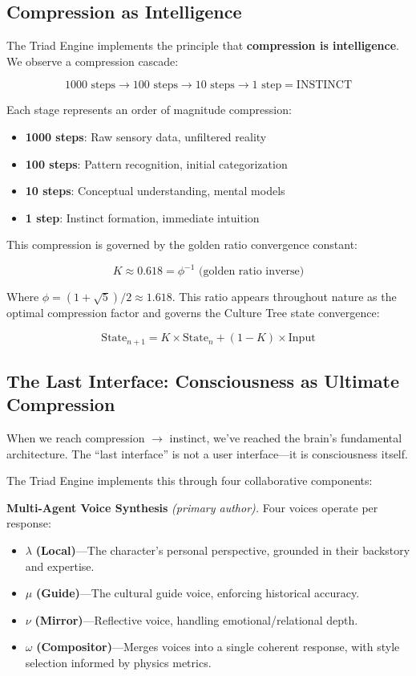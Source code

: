 \documentclass[11pt,a4paper]{article}
\begin{document}
\subsection{Compression as Intelligence}

The Triad Engine implements the principle that \textbf{compression is intelligence}. We observe a compression cascade:

\[
1000 \text{ steps} \rightarrow 100 \text{ steps} \rightarrow 10 \text{ steps} \rightarrow 1 \text{ step} = \text{INSTINCT}
\]

Each stage represents an order of magnitude compression:
\begin{itemize}
  \item \textbf{1000 steps}: Raw sensory data, unfiltered reality
  \item \textbf{100 steps}: Pattern recognition, initial categorization  
  \item \textbf{10 steps}: Conceptual understanding, mental models
  \item \textbf{1 step}: Instinct formation, immediate intuition
\end{itemize}

This compression is governed by the golden ratio convergence constant:

\[
K \approx 0.618 = \phi^{-1} \text{ (golden ratio inverse)}
\]

Where $\phi = (1+\sqrt{5})/2 \approx 1.618$. This ratio appears throughout nature as the optimal compression factor and governs the Culture Tree state convergence:

\[
\text{State}_{n+1} = K \times \text{State}_n + (1-K) \times \text{Input}
\]

\subsection{The Last Interface: Consciousness as Ultimate Compression}

When we reach compression $\rightarrow$ instinct, we've reached the brain's fundamental architecture. The ``last interface'' is not a user interface---it is consciousness itself.

The Triad Engine implements this through four collaborative components:

\medskip
\textbf{Multi-Agent Voice Synthesis} \textit{(primary author).}
Four voices operate per response:
\begin{itemize}
  \item $\lambda$ \textbf{(Local)}---The character's personal perspective,
        grounded in their backstory and expertise.
  \item $\mu$ \textbf{(Guide)}---The cultural guide voice, enforcing
        historical accuracy.
  \item $\nu$ \textbf{(Mirror)}---Reflective voice, handling
        emotional/relational depth.
  \item $\omega$ \textbf{(Compositor)}---Merges voices into a single coherent
        response, with style selection informed by physics metrics.
\end{itemize}
\end{document}
